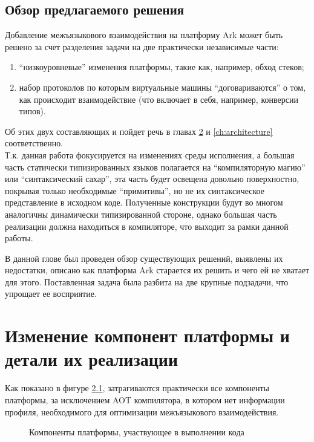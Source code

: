 \documentclass[times,specification,annotation]{itmo-student-thesis}
\begin{document}
\section{Обзор предлагаемого решения}
Добавление межъязыкового взаимодействия на платформу Ark может быть решено за счет разделения задачи на две практически независимые части:\\
\begin{enumerate}
	\item ``низкоуровневые'' изменения платформы, такие как, например, обход стеков;
	\item набор протоколов по которым виртуальные машины ``договариваются'' о том, как происходит взаимодействие (что включает в себя, например, конверсии типов).
\end{enumerate}
Об этих двух составляющих и пойдет речь в главах \ref{ch:platform} и \ref{ch:architecture} соответственно.\\
Т.к. данная работа фокусируется на изменениях среды исполнения, а большая часть статически типизированных языков полагается на ``компиляторную магию'' или ``синтаксический сахар'', эта часть будет освещена довольно поверхностно, покрывая только необходимые ``примитивы'', но не их синтаксическое представление в исходном коде. Полученные конструкции будут во многом аналогичны динамически типизированной стороне, однако большая часть реализации должна находиться в компиляторе, что выходит за рамки данной работы.

\chapterconclusion
В данной глове был проведен обзор существующих решений, выявлены их недостатки, описано как платформа Ark старается их решить и чего ей не хватает для этого. Поставленная задача была разбита на две крупные подзадачи, что упрощает ее восприятие.

\chapter{Изменение компонент платформы и детали их реализации}\label{ch:platform}
Как показано в фигуре \ref{fig:all-components}, затрагиваются практически все компоненты платформы, за исключением AOT компилятора, в котором нет информации профиля, необходимого для оптимизации межъязыкового взаимодействия.
\begin{figure}[!h]
	\caption{Компоненты платформы, участвующее в выполнении кода}\label{fig:all-components}
	\centering
	
\end{figure}
\end{document}
